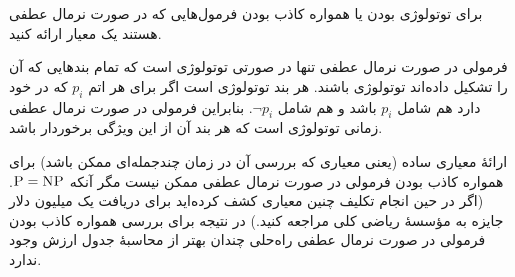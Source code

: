 برای توتولوژی بودن یا همواره کاذب بودن فرمول‌هایی که در صورت نرمال عطفی هستند یک معیار ارائه کنید.
\begin{ans}
    فرمولی در صورت نرمال عطفی تنها در صورتی توتولوژی است که تمام بندهایی که آن را تشکیل داده‌اند توتولوژی باشند. هر بند توتولوژی است اگر برای هر اتم
    $p_i$
    که در خود دارد هم شامل
    $p_i$
    باشد و هم شامل
    $\neg p_i$.
    بنابراین فرمولی در صورت نرمال عطفی زمانی توتولوژی است که هر بند آن از این ویژگی برخوردار باشد.
    
    ارائهٔ معیاری ساده (یعنی معیاری که بررسی آن در زمان چندجمله‌ای ممکن باشد) برای همواره کاذب بودن فرمولی در  صورت نرمال عطفی ممکن نیست مگر آنکه
    $\textsc{P}=\textsc{NP}$.
    (اگر در حین انجام تکلیف چنین معیاری کشف کرده‌اید برای دریافت یک میلیون دلار جایزه به مؤسسهٔ ریاضی کلی مراجعه کنید.) در نتیجه برای بررسی همواره کاذب بودن فرمولی در صورت نرمال عطفی راه‌حلی چندان بهتر از محاسبهٔ جدول ارزش وجود ندارد.
\end{ans}